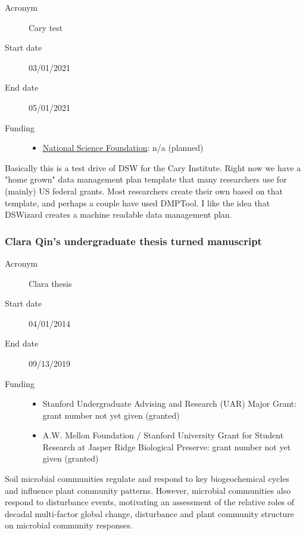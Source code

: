 \documentclass[
  english,
]{article}
\providecommand{\tightlist}{%
  \setlength{\itemsep}{0pt}\setlength{\parskip}{0pt}}
\begin{document}
\begin{description}
\item[Acronym]
Cary test
\item[Start date]
03/01/2021
\item[End date]
05/01/2021
\item[Funding]
\begin{itemize}
\tightlist
\item
  \href{http://dx.doi.org/10.13039/100000001}{National Science
  Foundation}: n/a (planned)
\end{itemize}
\end{description}

Basically this is a test drive of DSW for the Cary Institute. Right now
we have a "home grown" data management plan template that many
researchers use for (mainly) US federal grants. Most researchers create
their own based on that template, and perhaps a couple have used
DMPTool. I like the idea that DSWizard creates a machine readable data
management plan.

\hypertarget{clara-qins-undergraduate-thesis-turned-manuscript}{%
\subsubsection{Clara Qin's undergraduate thesis turned
manuscript}\label{clara-qins-undergraduate-thesis-turned-manuscript}}

\begin{description}
\item[Acronym]
Clara thesis
\item[Start date]
04/01/2014
\item[End date]
09/13/2019
\item[Funding]
\begin{itemize}
\tightlist
\item
  Stanford Undergraduate Advising and Research (UAR) Major Grant: grant
  number not yet given (granted)
\item
  A.W. Mellon Foundation / Stanford University Grant for Student
  Research at Jasper Ridge Biological Preserve: grant number not yet
  given (granted)
\end{itemize}
\end{description}

Soil microbial communities regulate and respond to key biogeochemical
cycles and influence plant community patterns. However, microbial
communities also respond to disturbance events, motivating an assessment
of the relative roles of decadal multi‐factor global change, disturbance
and plant community structure on microbial community responses.
\end{document}
